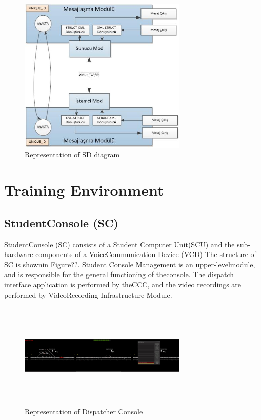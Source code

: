 \documentclass[conference]{IEEEtran}
\begin{document}
\begin{figure}[h!]
  \centering
  \includegraphics[width=8cm]{SDDiagram.jpg}
  \caption{Representation of SD  diagram}\label{fig:SDDiagram}
\end{figure}



\section{Training Environment}

\subsection{StudentConsole (SC)}

StudentConsole (SC) consists of a Student  Computer Unit(SCU)   and   the   sub-hardware   components   of   a   VoiceCommunication Device (VCD) The structure of SC is shownin  Figure??.  Student  Console  Management  is  an  upper-levelmodule,  and  is  responsible for  the general  functioning of theconsole. The dispatch interface application is performed by theCCC,   and   the   video   recordings   are  performed   by  VideoRecording Infrastructure Module.

\begin{figure}[h!]
  \centering
  \includegraphics[width=8cm,height=5cm]{ogrenci.jpg}
  \caption{Representation of Dispatcher Console}\label{fig:smclass}
\end{figure}
\end{document}

